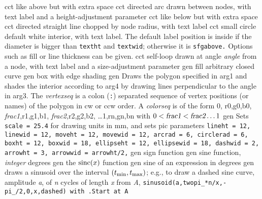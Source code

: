  {cct}
  {like above but with extra space}
  {cct}
  {directed arc drawn between nodes, with text label
    and a height-adjustment parameter }
  {cct}
  {like below but with extra space}
  {cct}
  {directed straight line chopped by node radius, with text label}
  {cct}
  {small circle default white interior, with text label. The default label
  position is inside if the diameter is bigger than {\tt textht} and
  {\tt textwid}; otherwise it is {\tt sfgabove.} Options such as fill or
  line thickness can be given.}
  {cct}
  {self-loop drawn at angle {\sl angle} from a node,
     with text label and a size-adjustment parameter }
  {gen}
  {fill arbitrary closed curve}
  {gen}
  {box with edge shading}
  {gen}
  {Draws the polygon specified in arg1 and shades the interior according
   to arg4 by drawing lines perpendicular to the angle in arg3.
   The {\sl vertexseq} is a colon ({\tt:}) separated sequence of vertex
   positions (or names) of the polygon in cw or ccw order. A {\sl colorseq}
   is of the form 0, r0,g0,b0, {\sl frac1},r1,g1,b1, {\sl frac2},r2,g2,b2,
   \ldots 1,rn,gn,bn with $0 < \hbox{\sl frac1} < \hbox{\sl frac2} \ldots 1$
}
  {gen}
  {Sets {\tt scale = 25.4} for drawing units in mm, and sets
   pic parameters {\tt lineht = 12, linewid = 12, moveht = 12, movewid = 12,
    arcrad = 6, circlerad = 6, boxht = 12, boxwid = 18, ellipseht = 12,
    ellipsewid = 18, dashwid = 2, arrowht = 3, arrowwid = arrowht/2,}}
  {gen}
  {sign function}
  {gen}
  {sine function, {\sl integer\/} degrees}
  {gen}
  {the $\hbox{sinc}(x)$ function}
  {gen}
  {sine of an expression in degrees}
  {gen}
  {draws a sinusoid over the interval
  $(t_{\hbox{\scriptsize min}}, t_{\hbox{\scriptsize max}})$;
   e.g., to draw a dashed sine curve, amplitude {\sl a}, of {\sl n} cycles
   of length {\sl x} from {\sl A},
   {\tt sinusoid(a,twopi\_*n/x,-pi\_/2,0,x,dashed) with .Start at A}}
